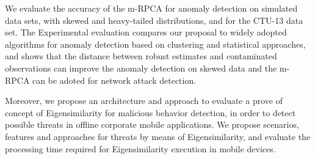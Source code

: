 {We evaluate the accuracy of the m-RPCA for anomaly detection on simulated data sets, with skewed and heavy-tailed distributions, and for the CTU-13 data set. The Experimental evaluation compares our proposal to widely adopted algorithms for anomaly detection based on clustering and statistical approaches, and shows that the distance between robust estimates and contaminated observations can improve the anomaly detection on skewed data and the m-RPCA can be adoted for network attack detection.

Moreover, we propose an architecture and approach to evaluate a prove of concept of Eigensimilarity for malicious behavior detection, in order to detect possible threats in offline corporate mobile applications. We propose scenarios, features and approaches for threats by means of Eigensimilarity, and evaluate the processing time required for Eigensimilarity execution in mobile devices.

}
